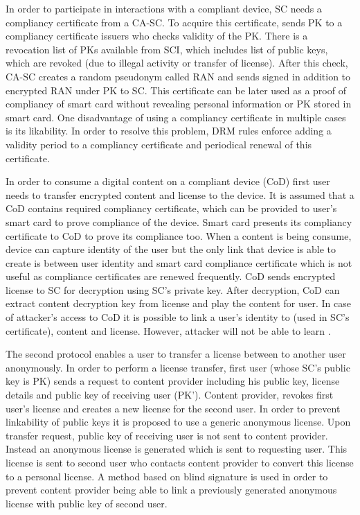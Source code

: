 \documentclass[times]{secauth}
\begin{document}
In order to participate in interactions with a compliant device, SC needs a compliancy certificate from a CA-SC. To acquire this certificate, sends PK to a compliancy certificate issuers who checks validity of the PK. There is a revocation list of PKs available from SCI, which includes list of public keys, which are revoked (due to illegal activity or transfer of license). After this check, CA-SC creates a random pseudonym called RAN and sends signed  in addition to encrypted RAN under PK to SC. This certificate can be later used as a proof of compliancy of smart card without revealing personal information or PK stored in smart card. One disadvantage of using a compliancy certificate in multiple cases is its likability. In order to resolve this problem, DRM rules enforce adding a validity period to a compliancy certificate and periodical renewal of this certificate.

In order to consume a digital content on a compliant device (CoD) first user needs to transfer encrypted content and license to the device. It is assumed that a CoD contains required compliancy certificate, which can be provided to user's smart card to prove compliance of the device. Smart card presents its compliancy certificate to CoD to prove its compliance too. When a content is being consume, device can capture identity of the user but the only link that device is able to create is between user identity and smart card compliance certificate which is not useful as compliance certificates are renewed frequently.
CoD sends encrypted license to SC for decryption using SC's private key. After decryption, CoD can extract content decryption key from license and play the content for user. 
In case of attacker's access to CoD it is possible to link a user's identity to  (used in SC's certificate), content and license. However, attacker will not be able to learn . 

The second protocol enables a user to transfer a license between to another user anonymously. In order to perform a license transfer, first user (whose SC's public key is PK) sends a request to content provider including his public key, license details and public key of receiving user (PK'). Content provider, revokes first user's license and creates a new license for the second user. In order to prevent linkability of public keys it is proposed to use a generic anonymous license. Upon transfer request, public key of receiving user is not sent to content provider. Instead an anonymous license is generated which is sent to requesting user. This license is sent to second user who contacts content provider to convert this license to a personal license. A method based on blind signature is used in order to prevent content provider being able to link a previously generated anonymous license with public key of second user.
\end{document}
